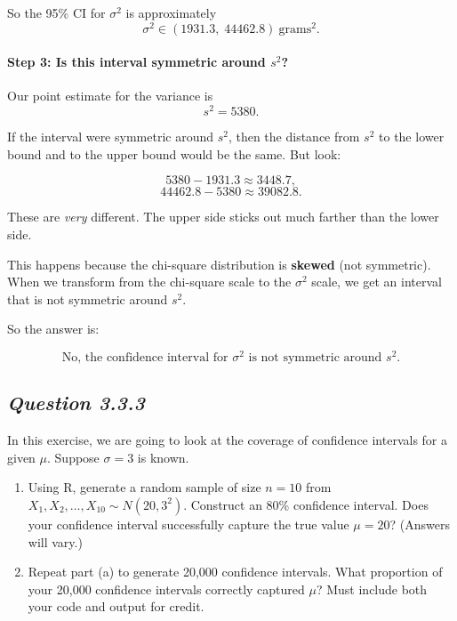 \documentclass[11pt,letterpaper]{article}
\theoremstyle{remark}
\begin{document}
So the 95\% CI for $\sigma^2$ is approximately
\[
\boxed{\sigma^2 \in (1931.3,\; 44462.8)\ \text{grams}^2.}
\]

\paragraph{Step 3: Is this interval symmetric around $s^2$?}

Our point estimate for the variance is
\[
s^2 = 5380.
\]

If the interval were symmetric around $s^2$, then the distance from $s^2$ to the lower bound and to the upper bound would be the same. But look:

\[
5380 - 1931.3 \approx 3448.7,
\]
\[
44462.8 - 5380 \approx 39082.8.
\]

These are \emph{very} different. The upper side sticks out much farther than the lower side.

This happens because the chi-square distribution is \textbf{skewed} (not symmetric). When we transform from the chi-square scale to the $\sigma^2$ scale, we get an interval that is not symmetric around $s^2$.

So the answer is:

\[
\boxed{\text{No, the confidence interval for }\sigma^2 \text{ is not symmetric around } s^2.}
\]

\newpage

\subsection*{\textbf{\textit{Question 3.3.3}}}

In this exercise, we are going to look at the coverage of confidence intervals for a given $\mu$.
Suppose $\sigma = 3$ is known.

\begin{enumerate}
    \item[(a)] Using R, generate a random sample of size $n = 10$ from
    $X_1, X_2, \ldots, X_{10} \sim N(20, 3^2)$. Construct an 80\% confidence interval.
    Does your confidence interval successfully capture the true value $\mu = 20$? (Answers will vary.)

    \item[(b)] Repeat part (a) to generate 20{,}000 confidence intervals.
    What proportion of your 20{,}000 confidence intervals correctly captured $\mu$?
    Must include both your code and output for credit.
\end{enumerate}
\end{document}
